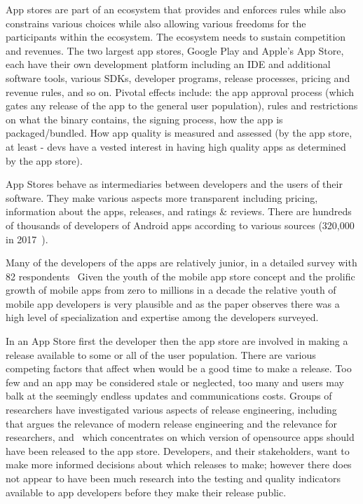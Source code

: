 App stores are part of an ecosystem that provides and enforces rules while also constrains various choices while also allowing various freedoms for the participants within the ecosystem. The ecosystem needs to sustain competition~ and revenues. The two largest app stores, Google Play and Apple's App Store, each have their own development platform including an IDE and additional software tools, various SDKs, developer programs, release processes, pricing and revenue rules, and so on. 
Pivotal effects include: the app approval process (which gates any release of the app to the general user population), rules and restrictions on what the binary contains, the signing process, how the app is packaged/bundled. How app quality is measured and assessed (by the app store, at least - devs have a vested interest in having high quality apps as determined by the app store).

App Stores behave as intermediaries between developers and the users of their software. They make various aspects more transparent including pricing, information about the apps, releases, and ratings \& reviews. There are hundreds of thousands of developers of Android apps according to various sources (320,000 in 2017~\cite{wang2017_exploratory_study_of_the_mobile_app_ecosystem}). 

Many of the developers of the apps are relatively junior, in a detailed survey with 82 respondents~\cite[p. 142 and p.134]{francese2017_mobile_app_development_and_management_results_from_a_quantitative_investigation} Given the youth of the mobile app store concept and the prolific growth of mobile apps from zero to millions in a decade the relative youth of mobile app developers is very plausible and as the paper observes there was a high level of specialization and expertise among the developers surveyed.

In an App Store first the developer then the app store are involved in making a release available to some or all of the user population. There are various competing factors that affect when would be a good time to make a release. Too few and an app may be considered stale or neglected, too many and users may balk at the seemingly endless updates and communications costs. Groups of researchers have investigated various aspects of release engineering, including~ that argues the relevance of modern release engineering and the relevance for researchers, and~ which concentrates on which version of opensource apps should have been released to the app store. Developers, and their stakeholders, want to make more informed decisions about which releases to make; however there does not appear to have been much research into the testing and quality indicators available to app developers before they make their release public.


